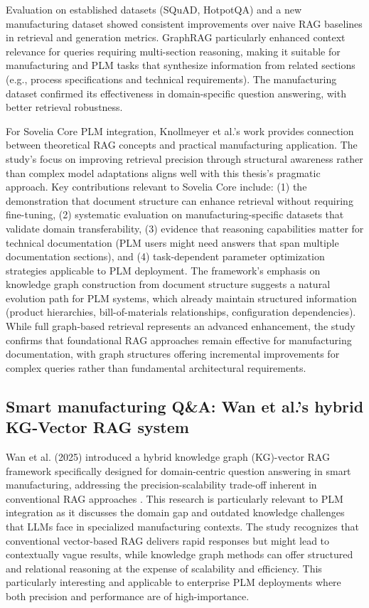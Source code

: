 Evaluation on established datasets (SQuAD, HotpotQA) and a new manufacturing dataset showed consistent improvements over naive RAG baselines in retrieval and generation metrics. GraphRAG particularly enhanced context relevance for queries requiring multi-section reasoning, making it suitable for manufacturing and PLM tasks that synthesize information from related sections (e.g., process specifications and technical requirements). The manufacturing dataset confirmed its effectiveness in domain-specific question answering, with better retrieval robustness. \parencite{knollmeyer_document_2025}

For Sovelia Core PLM integration, Knollmeyer et al.'s work provides connection between theoretical RAG concepts and practical manufacturing application. The study's focus on improving retrieval precision through structural awareness rather than complex model adaptations aligns well with this thesis's pragmatic approach. Key contributions relevant to Sovelia Core include: (1) the demonstration that document structure can enhance retrieval without requiring fine-tuning, (2) systematic evaluation on manufacturing-specific datasets that validate domain transferability, (3) evidence that reasoning capabilities matter for technical documentation (PLM users might need answers that span multiple documentation sections), and (4) task-dependent parameter optimization strategies applicable to PLM deployment. The framework's emphasis on knowledge graph construction from document structure suggests a natural evolution path for PLM systems, which already maintain structured information (product hierarchies, bill-of-materials relationships, configuration dependencies). While full graph-based retrieval represents an advanced enhancement, the study confirms that foundational RAG approaches remain effective for manufacturing documentation, with graph structures offering incremental improvements for complex queries rather than fundamental architectural requirements.

\subsection*{Smart manufacturing Q\&A: Wan et al.'s hybrid KG-Vector RAG system}

Wan et al. (2025) introduced a hybrid knowledge graph (KG)-vector RAG framework specifically designed for domain-centric question answering in smart manufacturing, addressing the precision-scalability trade-off inherent in conventional RAG approaches \parencite{wan_empowering_2025}. This research is particularly relevant to PLM integration as it discusses the domain gap and outdated knowledge challenges that LLMs face in specialized manufacturing contexts. The study recognizes that conventional vector-based RAG delivers rapid responses but might lead to contextually vague results, while knowledge graph methods can offer structured and relational reasoning at the expense of scalability and efficiency. This particularly interesting and applicable to enterprise PLM deployments where both precision and performance are of high-importance.

